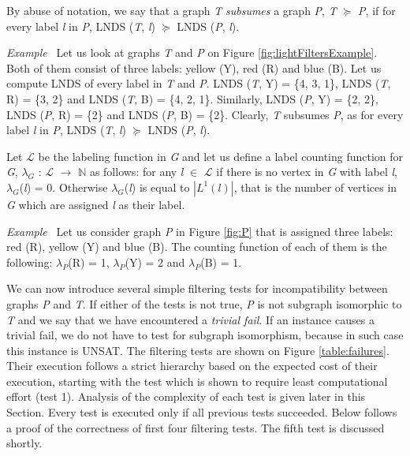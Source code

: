 \documentclass{l4proj}
\newcounter{example}[section]
\newenvironment{example}[1][]{\refstepcounter{example}\par\medskip
   \noindent \textit{Example~\theexample #1} \rmfamily}{\medskip}
\newcommand{\Lagr}{\mathcal{L}}
\begin{document}
By abuse of notation, we say that a graph \emph{T} \emph{subsumes} a graph \emph{P}, \emph{T} $\succeq$ \emph{P}, if for every label \emph{l} in \emph{P}, LNDS (\emph{T}, \emph{l}) $\succeq$ LNDS (\emph{P}, \emph{l}).

\begin{example}
Let us look at graphs \emph{T} and \emph{P} on Figure \ref{fig:lightFiltersExample}. Both of them consist of three labels: yellow (Y), red (R) and blue (B). Let us compute LNDS of every label in \emph{T} and \emph{P}. LNDS (\emph{T}, Y) = \{4, 3, 1\}, LNDS (\emph{T}, R) = \{3, 2\} and LNDS (\emph{T}, B) = \{4, 2, 1\}. Similarly, LNDS (\emph{P}, Y) = \{2, 2\}, LNDS (\emph{P}, R) = \{2\} and LNDS (\emph{P}, B) = \{2\}. Clearly, \emph{T} subsumes \emph{P}, as for every label \emph{l} in \emph{P}, LNDS (\emph{T}, \emph{l}) $\succeq$ LNDS (\emph{P}, \emph{l}).
\end{example}

Let $\Lagr$ be the labeling function in \emph{G} and let us define a label counting function for \emph{G}, $\lambda_{G}$ : $\Lagr$ $\rightarrow$ $\mathbb{N}$ as follows:
for any \emph{l} $\in$ $\Lagr$ if there is no vertex in \emph{G} with label \emph{l}, $\lambda_{G}$(\emph{l}) = 0. Otherwise $\lambda_{G}$(\emph{l}) is equal to $|L^{1}(l)|$, that is the number of vertices in \emph{G} which are assigned \emph{l} as their label.

\begin{example}
Let us consider graph \emph{P} in Figure \ref{fig:P} that is assigned three labels: red (R), yellow (Y) and blue (B). The counting function of each of them is the following: $\lambda_{P}$(R) = 1, $\lambda_{P}$(Y) = 2 and $\lambda_{P}$(B) = 1.
\end{example}

We can now introduce several simple filtering tests for incompatibility between graphs \emph{P} and \emph{T}. If either of the tests is not true, \emph{P} is not subgraph isomorphic to \emph{T} and we say that we have encountered a \emph{trivial fail}. If an instance causes a trivial fail, we do not have to test for subgraph isomorphism, because in such case this instance is UNSAT. The filtering tests are shown on Figure \ref{table:failures}. Their execution follows a strict hierarchy based on the expected cost of their execution, starting with the test which is shown to require least computational effort (test 1). Analysis of the complexity of each test is given later in this Section. Every test is executed only if all previous tests succeeded. Below follows a proof of the correctness of first four filtering tests. The fifth test is discussed shortly. 
\end{document}

